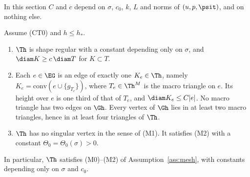 In this section $C$ and $c$ depend on $\sigma$, $c_0$, $k$, $L$ and norms of $(u,p,\psit)$, and on nothing else.

\begin{lemma}\label{ct:lem:mesh}
Assume (CT0) and $h\le h_\ast$.
\begin{enumerate}[label=(\alph*)]
\item $\Th$ is shape regular with a constant depending only on $\sigma$, and $\diam K\ge c\,\diam T$ for $K\subset T$.
\item Each $e\in\EG$ is an edge of exactly one $K_e\in\Th$, namely $K_e=\mathrm{conv}(e\cup\{g_{T_e}\})$, where $T_e\in\Th^M$ is the macro triangle on $e$. Its height over $e$ is one third of that of $T_e$, and $\diam K_e\le C|e|$. No macro triangle has two edges on $\Gh$. Every vertex of $\Gh$ lies in at least two macro triangles, hence in at least four triangles of $\Th$.
\item $\Th$ has no singular vertex in the sense of (M1). It satisfies (M2) with a constant $\Theta_0=\Theta_0(\sigma)>0$.
\end{enumerate}
In particular, $\Th$ satisfies (M0)--(M2) of Assumption~\ref{ass:mesh}, with constants depending only on $\sigma$ and $c_0$.
\end{lemma}

